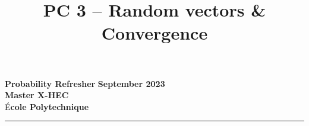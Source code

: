 \documentclass{article}
\title{PC 3 – Random vectors \& Convergence}
\author{}
\date{}
\begin{document}
\begin{flushleft}
  \textbf{Probability Refresher} \hfill \textbf{September 2023} \\
  \textbf{Master X-HEC} \hfill \\
  É\textbf{cole Polytechnique} \hfill
\end{flushleft}

{\let\newpage\relax\maketitle}
\vspace{-1.3cm}
\hrule

\vspace{0.5cm}



% 
\end{document}
